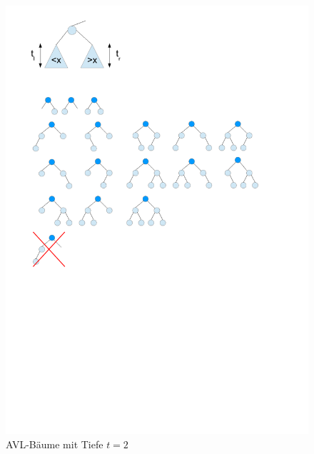 \documentclass[a4paper,twoside,10pt]{report}
\begin{document}
\begin{figure}[H]\center
\includegraphics[trim= 1cm 22cm 10cm 6cm,clip,width=\columnwidth]{figures/avlbase.pdf}
\caption{AVL-Bäume mit Tiefe $t=2$}
\end{figure}
\end{document}
